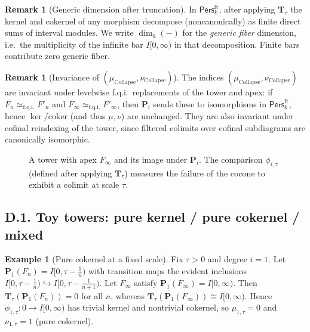 \documentclass[11pt]{article}
\newcommand{\Pers}{\mathsf{Pers}}
\numberwithin{equation}{section}
\theoremstyle{definition}
\newtheorem{example}[theorem]{Example}
\newtheorem{remark}[theorem]{Remark}
\DeclareRobustCommand{\muc}{\mu_{\mathrm{Collapse}}}
\DeclareRobustCommand{\nuc}{\nu_{\mathrm{Collapse}}}
\providecommand{\n}{\unskip\space}
\begin{document}
\begin{remark}[Generic dimension after truncation]\label{rem:D-generic-dim}
In \(\Pers^{\mathrm{ft}}_k\), after applying \(\mathbf{T}_\tau\) the kernel and cokernel of any morphism decompose (noncanonically) as finite direct sums of interval modules.
We write \(\dim_k(-)\) for the \emph{generic fiber} dimension, i.e.\ the multiplicity of the infinite bar \(I[0,\infty)\) in that decomposition.
Finite bars contribute zero generic fiber.
\end{remark}

\begin{remark}[Invariance of \((\muc,\nuc)\)]
The indices \((\muc,\nuc)\) are invariant under levelwise f.q.i.\ replacements of the tower and apex: if \(F_n\simeq_{\mathrm{f.q.i.}}F'_n\) and \(F_\infty\simeq_{\mathrm{f.q.i.}}F'_\infty\), then \(\mathbf{P}_i\) sends these to isomorphisms in \(\Pers^{\mathrm{ft}}_k\), hence \(\ker/\mathrm{coker}\) (and thus \(\mu,\nu\)) are unchanged.
They are also invariant under cofinal reindexing of the tower, since filtered colimits over cofinal subdiagrams are canonically isomorphic.
\end{remark}

\begin{figure}[t]
\centering
{}
\caption{A tower with apex \(F_\infty\) and its image under \(\mathbf{P}_i\).
The comparison \(\phi_{i,\tau}\) (defined after applying \(\mathbf{T}_\tau\)) measures the failure of the cocone to exhibit a colimit at scale \(\tau\).}
\end{figure}

\subsection*{D.1. Toy towers: pure kernel / pure cokernel / mixed}

\begin{example}[Pure cokernel at a fixed scale]\label{D:ex:pure-coker}
Fix \(\tau>0\) and degree \(i=1\).
Let \(\mathbf{P}_1(F_n)=I[0,\tau-\frac1n)\) with transition maps the evident inclusions \(I[0,\tau-\frac1n)\hookrightarrow I[0,\tau-\frac1{n+1})\).
Let \(F_\infty\) satisfy \(\mathbf{P}_1(F_\infty)=I[0,\infty)\).
Then \(\mathbf{T}_\tau(\mathbf{P}_1(F_n))=0\) for all \(n\), whereas \(\mathbf{T}_\tau(\mathbf{P}_1(F_\infty))\cong I[0,\infty)\).
Hence \(\phi_{1,\tau}:0\to I[0,\infty)\) has trivial kernel and nontrivial cokernel, so \(\mu_{1,\tau}=0\) and \(\nu_{1,\tau}=1\) (pure cokernel).
\end{example}
\end{document}
